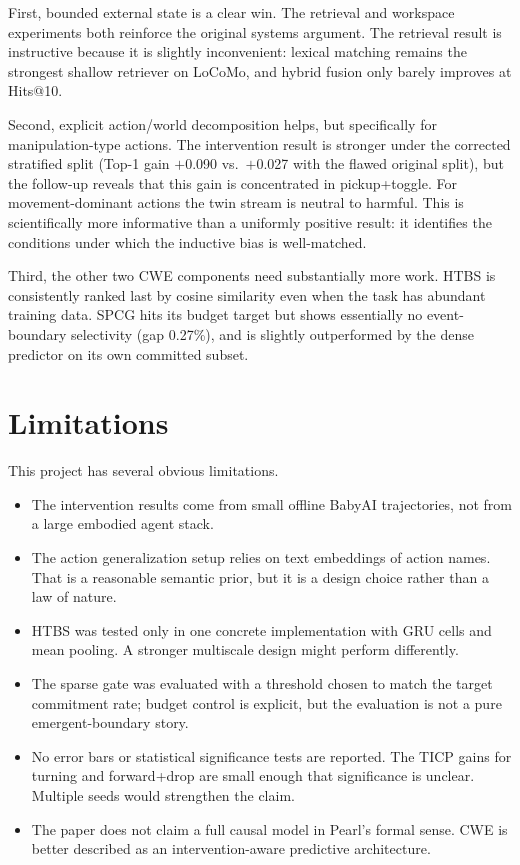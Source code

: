 \documentclass[11pt]{article}
\begin{document}
First, bounded external state is a clear win. The retrieval and workspace experiments both reinforce the original systems argument. The retrieval result is instructive because it is slightly inconvenient: lexical matching remains the strongest shallow retriever on LoCoMo, and hybrid fusion only barely improves at Hits@10.

Second, explicit action/world decomposition helps, but specifically for manipulation-type actions. The intervention result is stronger under the corrected stratified split (Top-1 gain $+$0.090 vs.\ $+$0.027 with the flawed original split), but the follow-up reveals that this gain is concentrated in pickup+toggle. For movement-dominant actions the twin stream is neutral to harmful. This is scientifically more informative than a uniformly positive result: it identifies the conditions under which the inductive bias is well-matched.

Third, the other two CWE components need substantially more work. HTBS is consistently ranked last by cosine similarity even when the task has abundant training data. SPCG hits its budget target but shows essentially no event-boundary selectivity (gap 0.27\%), and is slightly outperformed by the dense predictor on its own committed subset.

\section{Limitations}
This project has several obvious limitations.
\begin{itemize}
    \item The intervention results come from small offline BabyAI trajectories, not from a large embodied agent stack.
    \item The action generalization setup relies on text embeddings of action names. That is a reasonable semantic prior, but it is a design choice rather than a law of nature.
    \item HTBS was tested only in one concrete implementation with GRU cells and mean pooling. A stronger multiscale design might perform differently.
    \item The sparse gate was evaluated with a threshold chosen to match the target commitment rate; budget control is explicit, but the evaluation is not a pure emergent-boundary story.
    \item No error bars or statistical significance tests are reported. The TICP gains for turning and forward+drop are small enough that significance is unclear. Multiple seeds would strengthen the claim.
    \item The paper does not claim a full causal model in Pearl's formal sense. CWE is better described as an intervention-aware predictive architecture.
\end{itemize}
\end{document}

